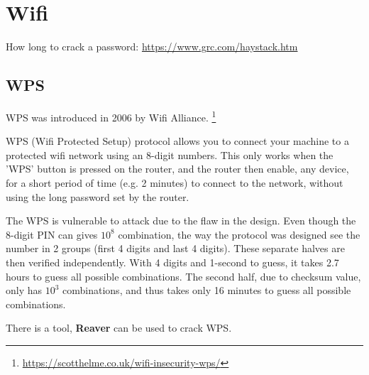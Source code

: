 \chapter{Wifi}
\label{chap:wifi}


How long to crack a password: \url{https://www.grc.com/haystack.htm}

\section{WPS}
\label{sec:WPS}

WPS was introduced in 2006 by Wifi Alliance.
\footnote{\url{https://scotthelme.co.uk/wifi-insecurity-wps/}}

WPS (Wifi Protected Setup) protocol allows you to connect your machine to a
protected wifi network using an 8-digit numbers. This only works when the 'WPS'
button is pressed on the router, and the router then enable, any device, for a
short period of time (e.g. 2 minutes) to connect to the network, without
using the long password set by the router. 

The WPS is vulnerable to attack due to the flaw in the design. Even though the
8-digit PIN can gives $10^8$ combination, the way the protocol was designed see
the number in 2 groups (first 4 digits and last 4 digits). These separate halves
are then verified independently. With 4 digits and 1-second to guess, it takes
2.7 hours to guess all possible combinations. The second half, due to checksum
value, only has $10^3$ combinations, and thus takes only 16 minutes to guess all
possible combinations. 

There is a tool, {\bf Reaver} can be used to crack WPS.



